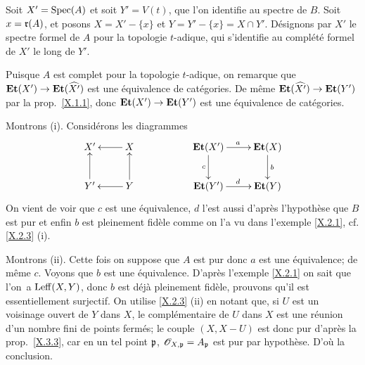 Soit $X'=\operatorname{Spec}(A)$ et soit $Y'=V(t)$, que l'on identifie au spectre de $B$. Soit $x=\mathfrak{r}(A)$, et posons $X=X'-\{x\}$ et $Y=Y'-\{x\}=X\cap Y'$. D\'esignons par $X'$ le spectre formel de $A$ pour la topologie $t$-adique, qui s'identifie au compl\'et\'e formel de $X'$ le long de $Y'$.

Puisque $A$ est complet pour la topologie $t$-adique, on remarque que $\Et(X')\to\Et(\widehat{X'})$ est une \'equivalence de cat\'egories. De m\^eme $\Et(\widehat{X'})\to\Et(Y')$ par la prop.\, \ref{X.1.1}, donc $\Et(X')\to\Et(Y')$ est une \'equivalence de cat\'egories.

Montrons (i). Consid\'erons les diagrammes
\[
\xymatrix{ X^{\prime} & X\ar[l] && \Et(X^{\prime})\ar[r]^a \ar[d]_c & \Et(X)\ar[d]^b\\
Y^{\prime}\ar[u] & Y\ar[l] \ar[u] && \Et(Y^{\prime})\ar[r]^d & \Et(Y)}
\]
On vient de voir que $c$ est une \'equivalence, $d$ l'est aussi d'apr\`es l'hypoth\`ese que $B$ est pur et enfin $b$ est pleinement fid\`ele comme on l'a vu dans l'exemple \ref{X.2.1}, cf. \ref{X.2.3} (i).

Montrons (ii). Cette fois on suppose que $A$ est pur donc $a$ est une \'equivalence; de m\^eme $c$. Voyons que $b$ est une \'equivalence. D'apr\`es l'exemple \ref{X.2.1} on sait que l'on~a $\operatorname{Leff}(X, Y)$, donc $b$ est d\'ej\`a pleinement fid\`ele, prouvons qu'il est essentiellement surjectif. On utilise \ref{X.2.3} (ii) en notant que, si $U$ est un voisinage ouvert de $Y$ dans $X$, le compl\'ementaire de $U$ dans $X$ est une r\'eunion d'un nombre fini de points ferm\'es; le couple $(X,X-U)$ est donc pur d'apr\`es la prop.\, \ref{X.3.3}, car en un tel point $\mathfrak{p}$, ${\mathscr O}_{X,\mathfrak{p}}=A_{\mathfrak{p}}$ est pur par hypoth\`ese. D'o\`u la conclusion.


